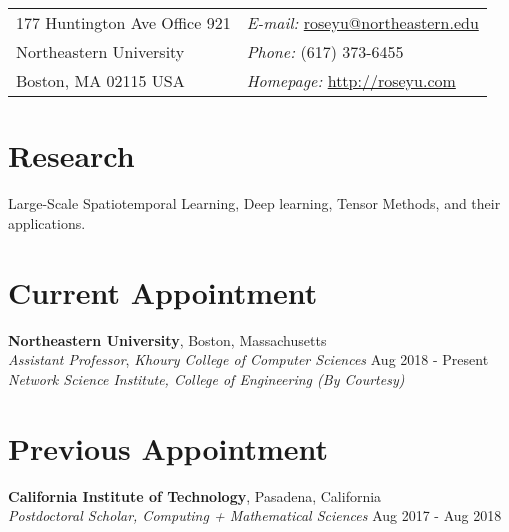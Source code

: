 \documentclass[margin,line]{res}
\newenvironment{list1}{
  \begin{list}{\ding{113}}{%
      \setlength{\itemsep}{0in}
      \setlength{\parsep}{0in} \setlength{\parskip}{0in}
      \setlength{\topsep}{0in} \setlength{\partopsep}{0in} 
      \setlength{\leftmargin}{0.17in}}}{\end{list}}
\begin{document}
\begin{resume}
\section{\sc }
\vspace{.05in}
\begin{tabular}{@{}p{2in}p{4in}}
177 Huntington Ave Office 921 & {\it E-mail:}  \url{roseyu@northeastern.edu } \\   
Northeastern University & {\it Phone:}  (617) 373-6455 \\            
Boston, MA 02115 USA    & {\it Homepage:} \url{http://roseyu.com} \\     
\end{tabular}


\section{\sc Research}
Large-Scale Spatiotemporal  Learning, Deep learning, Tensor Methods, and their applications.

\section{\sc Current Appointment}


{\bf Northeastern University}, Boston, Massachusetts \\
{\em Assistant Professor}, {\em Khoury College of Computer Sciences}  \hfill {Aug 2018 - Present }\\
{\em Network Science Institute, College of Engineering (By Courtesy)}


\section{\sc Previous Appointment}
{\bf California Institute of Technology}, Pasadena, California\\
{\em Postdoctoral Scholar,  Computing + Mathematical Sciences} \hfill {Aug 2017 - Aug 2018}


\end{resume}
\end{document}
